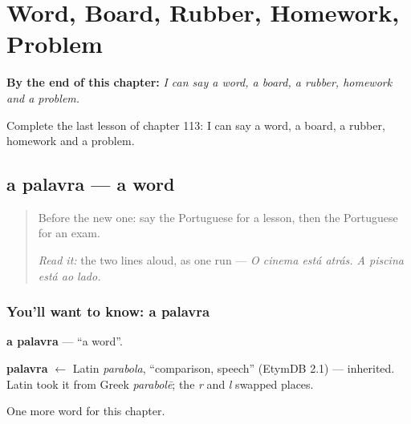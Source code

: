
\chapter{Word, Board, Rubber, Homework, Problem}
\label{ch:pt-word-board-rubber-homework-problem}

\begin{chapteropening}
\textbf{By the end of this chapter:} \emph{I can say a word, a board, a rubber, homework and a problem.}

Complete the last lesson of chapter 113: I can say a word, a board, a rubber, homework and a problem.
\end{chapteropening}

\section[a palavra]{a palavra — a word}

\label{lesson:PT-C113-palavra}



\begin{quote}
Before the new one: say the Portuguese for a lesson, then the Portuguese for an exam.

\emph{Read it:} the two lines aloud, as one run — \emph{O cinema está atrás. A piscina está ao lado.}
\end{quote}

\subsection*{You'll want to know: a palavra}
\textbf{a palavra} — \textquotedblleft{}a word\textquotedblright{}.

\begin{cousinweb}
\textbf{palavra} $\leftarrow$ Latin \emph{parabola}, \textquotedblleft{}comparison, speech\textquotedblright{} (EtymDB 2.1) — inherited. Latin took it from Greek \emph{parabolē}; the \emph{r} and \emph{l} swapped places.
\end{cousinweb}

\begin{grammarlens}[title={What you've built}]
One more word for this chapter.
\end{grammarlens}

